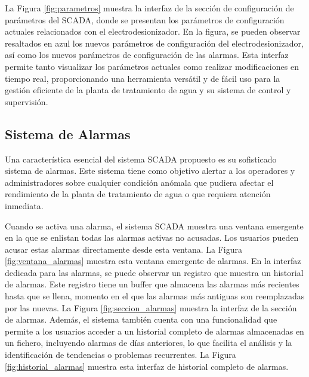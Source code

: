 La Figura \ref{fig:parametros} muestra la interfaz de la sección de configuración de parámetros del SCADA, donde se presentan los parámetros de configuración actuales relacionados con el electrodesionizador. En la figura, se pueden observar resaltados en azul los nuevos parámetros de configuración del electrodesionizador, así como los nuevos parámetros de configuración de las alarmas. Esta interfaz permite tanto visualizar los parámetros actuales como realizar modificaciones en tiempo real, proporcionando una herramienta versátil y de fácil uso para la gestión eficiente de la planta de tratamiento de agua y su sistema de control y supervisión.
\subsection{Sistema de Alarmas}

Una característica esencial del sistema SCADA propuesto es su sofisticado sistema de alarmas. Este sistema tiene como objetivo alertar a los operadores y administradores sobre cualquier condición anómala que pudiera afectar el rendimiento de la planta de tratamiento de agua o que requiera atención inmediata.

Cuando se activa una alarma, el sistema SCADA muestra una ventana emergente en la que se enlistan todas las alarmas activas no acusadas. Los usuarios pueden acusar estas alarmas directamente desde esta ventana. La Figura \ref{fig:ventana_alarmas} muestra esta ventana emergente de alarmas.
En la interfaz dedicada para las alarmas, se puede observar un registro que muestra un historial de alarmas. Este registro tiene un buffer que almacena las alarmas más recientes hasta que se llena, momento en el que las alarmas más antiguas son reemplazadas por las nuevas. La Figura \ref{fig:seccion_alarmas} muestra la interfaz de la sección de alarmas.
Además, el sistema también cuenta con una funcionalidad que permite a los usuarios acceder a un historial completo de alarmas almacenadas en un fichero, incluyendo alarmas de días anteriores, lo que facilita el análisis y la identificación de tendencias o problemas recurrentes. La Figura \ref{fig:historial_alarmas} muestra esta interfaz de historial completo de alarmas.


